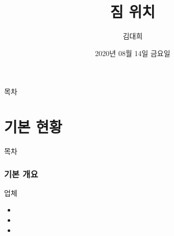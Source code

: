 \documentclass[aspectratio=1610,17pt,xcolor=pdftex,dvipsnames,table,handout]{beamer}
\begin{document}
	

			\title{짐 위치 }

			\author{김대희}

			\date{2020년 
					08월 
					14일
					금요일 }



		\begin{frame}[plain]
		\titlepage
		\end{frame}



		\begin{frame} {목차}
		\tableofcontents
		\end{frame}
		

		\part{기본 현황}
		\frame{\partpage}


		\begin{frame} [plain]{목차}
		\tableofcontents
		\end{frame}
		

		
				
		
		\section{기본 개요}
		\frame [plain] {\sectionpage}
		

		\begin{frame} [t,plain]
			\begin{block} {업체 }
			\begin{itemize}
				\item 
				\item 
				\item 
			\end{itemize}
			
			\end{block}
		\end{frame}
		
\end{document}
